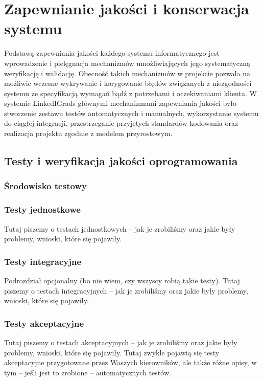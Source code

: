\chapter{Zapewnianie jakości i konserwacja systemu}
\label{Chapter7}

Podstawą zapewniania jakości każdego systemu informatycznego jest wprowadzenie i pielęgnacja mechanizmów umożliwiających jego systematyczną weryfikację i walidację. Obecność takich mechanizmów w projekcie pozwala na możliwie wczesne wykrywanie i korygowanie błędów związanych z niezgodności systemu ze specyfikacją wymagań bądź z potrzebami i oczekiwaniami klienta. W systemie LinkedIGrads głównymi mechanizmami zapewniania jakości było stworzenie zestawu testów automatycznych i manualnych, wykorzystanie systemu do ciągłej integracji, przestrzeganie przyjętych standardów kodowania oraz realizacja projektu zgodnie z modelem przyrostowym.

\section{Testy i weryfikacja jakości oprogramowania}
\label{Chapter71}

\subsection{Środowisko testowy}


\subsection{Testy jednostkowe}
\label{Chapter711}

Tutaj piszemy o testach jednostkowych -- jak je zrobiliśmy oraz jakie były problemy, wnioski, które się pojawiły.

\subsection{Testy integracyjne}
\label{Chapter712}

Podrozdział opcjonalny (bo nie wiem, czy wszyscy robią takie testy). Tutaj piszemy o testach integracyjnych -- jak je zrobiliśmy oraz jakie były problemy, wnioski, które się pojawiły.

\subsection{Testy akceptacyjne}
\label{Chapter713}

Tutaj piszemy o testach akceptacyjnych -- jak je zrobiliśmy oraz jakie były problemy, wnioski, które się pojawiły. Tutaj zwykle pojawią się testy akceptacyjne przygotowane przez Waszych kierowników, ale także różne opisy, w tym -- jeśli jest to zrobione -- automatycznych testów. 

